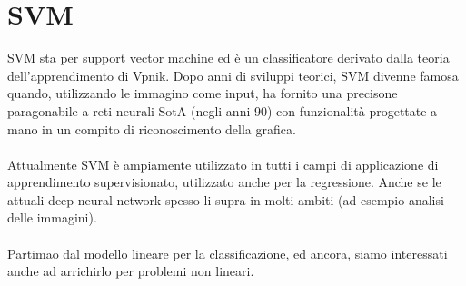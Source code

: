 \newpage
\section{SVM}
SVM sta per support vector machine ed è un classificatore derivato dalla teoria dell'apprendimento di Vpnik. Dopo anni
di sviluppi teorici, SVM divenne famosa quando, utilizzando le immagino come input, ha fornito una precisone paragonabile a reti neurali
SotA (negli anni 90) con funzionalità progettate a mano in un compito di riconoscimento della grafica. \\\\
Attualmente SVM è ampiamente utilizzato in tutti i campi di applicazione di apprendimento supervisionato, utilizzato anche per la regressione. Anche se le attuali deep-neural-network spesso 
li supra in molti ambiti (ad esempio analisi delle immagini).\\\\
Partimao dal modello lineare per la classificazione, ed ancora, siamo interessati anche ad arrichirlo per problemi non lineari.

